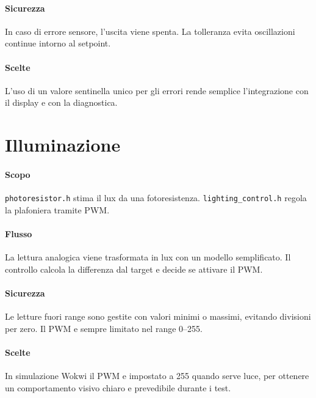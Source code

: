 \paragraph{Sicurezza} In caso di errore sensore, l'uscita viene spenta. La tolleranza evita oscillazioni continue intorno al setpoint.

\paragraph{Scelte} L'uso di un valore sentinella unico per gli errori rende semplice l'integrazione con il display e con la diagnostica.

\section{Illuminazione}
\paragraph{Scopo} \texttt{photoresistor.h} stima il lux da una fotoresistenza. \texttt{lighting\_control.h} regola la plafoniera tramite PWM.

\paragraph{Flusso} La lettura analogica viene trasformata in lux con un modello semplificato. Il controllo calcola la differenza dal target e decide se attivare il PWM.

\paragraph{Sicurezza} Le letture fuori range sono gestite con valori minimi o massimi, evitando divisioni per zero. Il PWM e sempre limitato nel range 0--255.

\paragraph{Scelte} In simulazione Wokwi il PWM e impostato a 255 quando serve luce, per ottenere un comportamento visivo chiaro e prevedibile durante i test.
